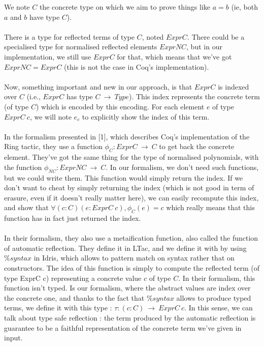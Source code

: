 \documentclass{llncs}
\begin{document}
We note $C$ the concrete type on which we aim to prove things like $a=b$ (ie, both $a$ and $b$ have type $C$).
\\
\\
There is a type for reflected terms of type $C$, noted $ExprC$.
There could be a specialised type for normalised reflected elements $ExprNC$, but in our implementation, we still use $ExprC$ for that, which means that we've got $ExprNC = ExprC$ (this is not the case in Coq's implementation).
\\
\\
Now, something important and new in our approach, is that $ExprC$ is indexed over $C$ (i.e., $ExprC$ has type $C\ \rightarrow\ Type$). This index represents the concrete term (of type $C$) which is encoded by this encoding.
For each element $e$ of type $ExprC\ c$, we will note $e_c$ to explicitly show the index of this term.
\\
\\
In the formalism presented in [1], which describes Coq's implementation of the Ring tactic, they use a function $\phi_{C} : ExprC\ \rightarrow\ C$ to get back the concrete element.
They've got the same thing for the type of normalised polynomials, with the function $\phi_{NC} : ExprNC\ \rightarrow\ C$. 
In our formalism, we don't need such functions, but we could write them. This function would simply return the index. If we don't want to cheat by simply returning the index (which is not good in term of erasure, even if it doesn't really matter here), we can easily recompute this index, and show that $\forall (c:C) (e:ExprC\ c), \phi_C (e) = c$ which really means that this function has in fact just returned the index.
\\
\\
In their formalism, they also use a metaification function, also called the function of automatic reflection. They define it in LTac, and we define it with  by using $\%syntax$ in Idris, which allows to pattern match on syntax rather that on constructors. The idea of this function is simply to compute the reflected term (of type ExprC c) representing a concrete value $c$ of type $C$.
In their formalism, this function isn't typed. Is our formalism, where the abstract values are index over the concrete one, and thanks to the fact that $\%syntax$ allows to produce typed terms, we define it with this type : $\tau : (c:C)\ \rightarrow\ ExprC\ c$. In this sense, we can talk about type safe reflection : the term produced by the automatic reflection is guarantee to be a faithful representation of the concrete term we've given in input.
\end{document}
